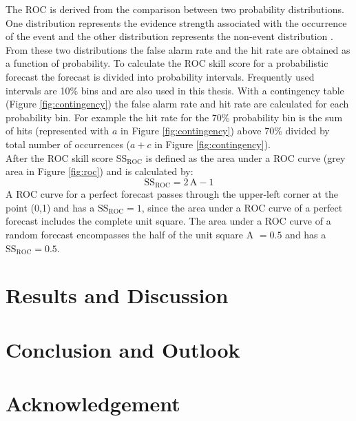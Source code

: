 \documentclass[11pt,twoside,a4paper,fleqn,x11names]{report}
\numberwithin{equation}{chapter}
\numberwithin{figure}{chapter}
\numberwithin{table}{chapter}
\begin{document}
The ROC is derived from the comparison between two probability distributions. One distribution represents the evidence strength associated with the occurrence of the event and the other distribution represents the non-event distribution \citep{Kharin2003}. From these two distributions the false alarm rate and the hit rate are obtained as a function of probability. To calculate the ROC skill score for a probabilistic forecast the forecast is divided into probability intervals. Frequently used intervals are 10\% bins and are also used in this thesis. With a contingency table (Figure \ref{fig:contingency}) the false alarm rate and hit rate are calculated for each probability bin. For example the hit rate for the 70\% probability bin is the sum of hits (represented with $a$ in Figure \ref{fig:contingency})  above 70\% divided by total number of occurrences ($a + c$ in Figure \ref{fig:contingency}).\\
After \cite{Wilks} the ROC skill score SS$_\text{ROC}$ is defined as the area  under a ROC curve (grey area in Figure \ref{fig:roc}) and is calculated by:
\begin{equation}
	\text{SS}_{\text{ROC}} = 2\,\text{A} -1
	\label{eq:roc}
\end{equation}
A ROC curve for a perfect forecast passes through the upper-left corner at the point (0,1) and has a $\text{SS}_{\text{ROC}} = 1$, since the area under a ROC curve of a perfect forecast includes the complete unit square. The area under a ROC curve of a random forecast encompasses the half of the unit square A $ = 0.5$ and has a $\text{SS}_{\text{ROC}} = 0.5$.

\chapter{Results and Discussion}

\chapter{Conclusion and Outlook}
\chapter{Acknowledgement}

\end{document}
